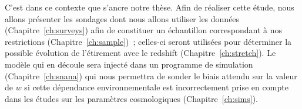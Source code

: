 \documentclass[../main/main.tex]{subfiles}
\begin{document}
C'est dans ce contexte que s'ancre notre thèse. Afin de réaliser cette étude,
nous allons présenter les sondages dont nous allons utiliser les données
(Chapitre~\ref{ch:surveys}) afin de constituer un échantillon correspondant à
nos restrictions (Chapitre~\ref{ch:sample})~; celles-ci seront utilisées pour
déterminer la possible évolution de l'étirement avec le redshift
(Chapitre~\ref{ch:stretch}). Le modèle qui en découle sera injecté dans un
programme de simulation (Chapitre~\ref{ch:snana}) qui nous permettra de sonder
le biais attendu sur la valeur de $w$ si cette dépendance environnementale est
incorrectement prise en compte dans les études sur les paramètres cosmologiques
(Chapitre~\ref{ch:sims}).

\clearpage

\thispagestyle{plain}
\vfill
\minilof
\vfill
\minilot
\vfill


\shorthandoff{:}

\end{document}
